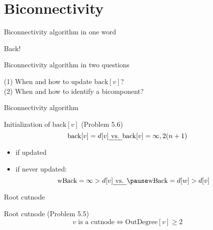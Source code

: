 \section{Biconnectivity}

\begin{frame}{Biconnectivity algorithm in one word}
  \centerline{\Huge Back!}
\end{frame}
\begin{frame}{Biconnectivity algorithm in two questions}
  \begin{center}
	(1) When and how to update $\text{back}[v]$? \\[15pt] \pause
	(2) When and how to identify a bicomponent?
  \end{center}
\end{frame}
\begin{frame}{Biconnectivity algorithm}
  \begin{exampleblock}{Initialization of $\text{back}[v]$ (Problem 5.6)}
	\[
	  \text{back}[v] = d[v] \text{\emph{ vs. }} \text{back}[v] = \infty, 2(n+1) 
	\]
  \end{exampleblock}


  \pause
  \vspace{0.50cm}
  \begin{itemize}
	\item if updated
	  \pause
	\item if never updated: 
	  \[
		\text{wBack} = \infty > d[v] \text{\emph{ vs. }} \pause \text{wBack} = d[w] > d[v]
	  \]
  \end{itemize}
\end{frame}
\begin{frame}{Root cutnode}
  \begin{exampleblock}{Root cutnode (Problem 5.5)}
	\[
	  v \text{ is a cutnode} \iff \text{OutDegree}[v] \ge 2
	\]
  \end{exampleblock}

  \pause
\end{frame}
